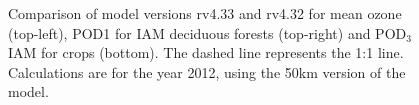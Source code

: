 \begin{figure}
\caption{Comparison of model versions rv4.33 and rv4.32
 for mean ozone (top-left), POD1 for IAM deciduous forests (top-right) and
 POD$_3$IAM for crops (bottom). The dashed line represents the 1:1 line.
 Calculations are for the year 2012, using the 50km version of the model.
  \label{fig:PODbug}}
\end{figure}








